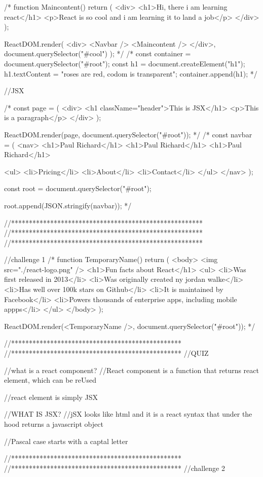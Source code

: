 /* function Maincontent() {
  return (
    <div>
      <h1>Hi, there i am learning react</h1>
      <p>React is so cool and i am learning it to land a job</p>
    </div>
  );
}

ReactDOM.render(
  <div>
    <Navbar />
    <Maincontent />
  </div>,
  document.querySelector("#cool")
);
 */
/* 
const container = document.querySelector("#root");
const h1 = document.createElement("h1");
h1.textContent = "roses are red, codom is transparent";
container.append(h1); */

//JSX

/* const page = (
  <div>
    <h1 className="header">This is JSX</h1>
    <p>This is a paragraph</p>
  </div>
);

ReactDOM.render(page, document.querySelector("#root"));
 */
/* 
const navbar = (
  <nav>
    <h1>Paul Richard</h1>
    <h1>Paul Richard</h1>
    <h1>Paul Richard</h1>

    <ul>
      <li>Pricing</li>
      <li>About</li>
      <li>Contact</li>
    </ul>
  </nav>
);

const root = document.querySelector("#root");

root.append(JSON.stringify(navbar));
 */

//******************************************************
//******************************************************
//******************************************************

//challenge 1
/* 
function TemporaryName() {
  return (
    <body>
      <img src="./react-logo.png" />
      <h1>Fun facts about React</h1>
      <ul>
        <li>Was first released in 2013</li>
        <li>Was originally created ny jordan walke</li>
        <li>Has well over 100k stars on Github</li>
        <li>It is maintained by Facebook</li>
        <li>Powers thousands of enterprise apps, including mobile appps</li>
      </ul>
    </body>
  );
}

ReactDOM.render(<TemporaryName />, document.querySelector("#root"));
 */

//************************************************
//************************************************
//QUIZ

//what is a react component?
//React component is a function that returns react element, which can be reUsed

//react element is simply JSX

//WHAT IS JSX?
//jSX looks like html and it is a react syntax that under the hood returns a javascript object

//Pascal case starts with a captal letter

//************************************************
//************************************************
//challenge 2